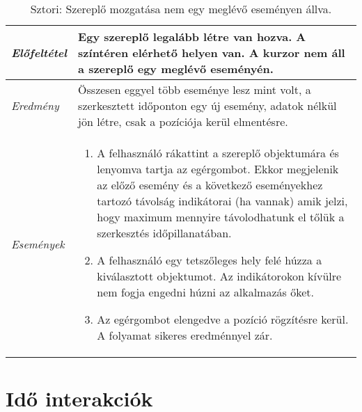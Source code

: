 \begin{table}[H]
	\centering
	\begin{tabular}{ | m{} | m{} | }
		\hline
		\emph{Előfeltétel} & Egy szereplő legalább létre van hozva. A színtéren elérhető helyen van. A kurzor nem áll a szereplő egy meglévő eseményén. \\
		\hline
		\emph{Eredmény} & Összesen eggyel több eseménye lesz mint volt, a szerkesztett időponton egy új esemény, adatok nélkül jön létre, csak a pozíciója kerül elmentésre. \\
		\hline
		\hline
		\emph{Események} &

		\begin{enumerate}[itemsep=-1ex]
			\item A felhasználó rákattint a szereplő objektumára és lenyomva tartja az egérgombot. Ekkor megjelenik az előző esemény és a következő eseményekhez tartozó távolság indikátorai (ha vannak) amik jelzi, hogy maximum mennyire távolodhatunk el tőlük a szerkesztés időpillanatában.
			\item A felhasználó egy tetszőleges hely felé húzza a kiválasztott objektumot. Az indikátorokon kívülre nem fogja engedni húzni az alkalmazás őket.
			\item Az egérgombot elengedve a pozíció rögzítésre kerül. A folyamat sikeres eredménnyel zár.
		\end{enumerate}
		\\
		\hline
	\end{tabular}
	\caption{Sztori: Szereplő mozgatása nem egy meglévő eseményen állva.}
	\label{tab:story-actor-move-not-on-event}
\end{table}

\section{Idő interakciók}

